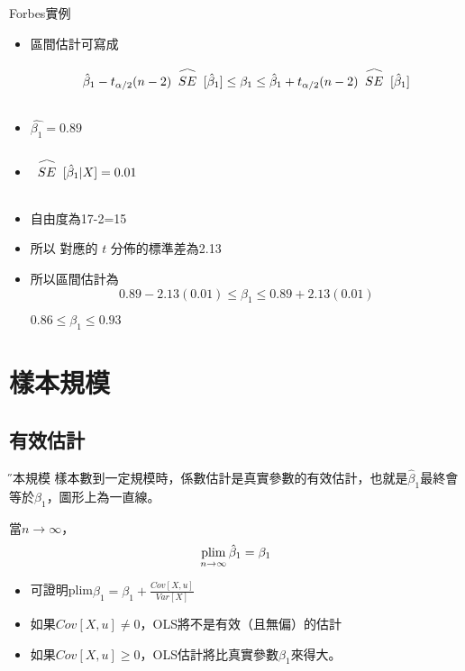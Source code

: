 \documentclass[xcolor=dvipsnames]{beamer}
\DeclareMathOperator*{\plim}{plim}
\newcommand\reallywidehat[1]{%
\begin{array}{c}
\stretchto{
  \scaleto{
    \scalerel*[\widthof{#1}]{\bigwedge}
    {\rule[-\textheight/2]{1ex}{\textheight}} %
  }{1.25\textheight} %
}{0.5ex}\\           %
#1\\                 %
\rule{-1ex}{0ex}
\end{array}
}
\begin{document}
\begin{frame}{Forbes實例}
\begin{itemize}
\item 區間估計可寫成
\[\hat{\beta}_{1}-t_{\alpha/2}(n-2)\reallywidehat{SE}[\hat{\beta}_{1}]\leq \beta_{1}\leq
\hat{\beta}_{1}+t_{\alpha/2}(n-2)\reallywidehat{SE}[\hat{\beta}_{1}] \]
\item $\hat{\beta_{1}}=0.89$
\item $\reallywidehat{SE}[\hat{\beta}_{1}|X]=0.01$
\item 自由度為17-2=15
\item 所以 對應的 $t$ 分佈的標準差為2.13
\item 所以區間估計為
\[0.89-2.13(0.01)\leq \beta_{1}\leq 0.89+2.13(0.01)\]
\begin{center}
$0.86\leq \beta_{1}\leq 0.93$
\end{center}
\end{itemize}
\end{frame}
\section{樣本規模}
\subsection{有效估計}
\begin{frame}{\H 樣本規模}
樣本數到一定規模時，係數估計是真實參數的有效估計，也就是$\hat{\beta}_{1}$最終會等於$\beta_{1}$，圖形上為一直線。
\begin{theorem}
當$n\rightarrow \infty$，
\begin{gather}
\plim_{n\to\infty}\hat{\beta}_{1}=\beta_{1}\notag
\end{gather}
\end{theorem}
\begin{itemize}
\item 可證明plim$\hat{\beta}_{1}=\beta_{1}+\frac{Cov[X,u]}{Var[X]}$
\item 如果$Cov[X,u]\neq 0$，OLS將不是有效（且無偏）的估計\\
\item 如果$Cov[X,u]\geq 0$，OLS估計將比真實參數$\beta_{1}$來得大。
\end{itemize}
\end{frame}
\end{document}
